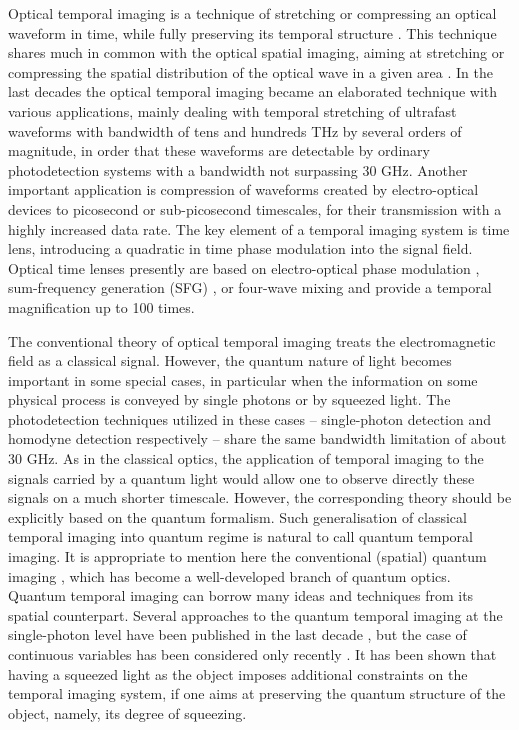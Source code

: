 \documentclass[10pt,twocolumn]{article}
\begin{document}
Optical temporal imaging is a technique of stretching or compressing an optical waveform in time, while fully preserving its temporal structure \cite{Copmany2011,Salem2013}. This technique shares much in common with the optical spatial imaging, aiming at stretching or compressing the spatial distribution of the optical wave in a given area \cite{Kolner1994}. In the last decades the optical temporal imaging became an elaborated technique with various applications, mainly dealing with temporal stretching of ultrafast waveforms with bandwidth of tens and hundreds THz by several orders of magnitude, in order that these waveforms are detectable by ordinary photodetection systems with a bandwidth not surpassing 30 GHz. Another important application is compression of waveforms created by electro-optical devices to picosecond or sub-picosecond timescales, for their transmission with a highly increased data rate. The key element of a temporal imaging system is time lens, introducing a quadratic in time phase modulation into the signal field. Optical time lenses presently are based on electro-optical phase modulation \cite{Giordmaine1968,Grischowsky1974,Kolner1988,Kolner1989,Karpinski2016}, sum-frequency generation (SFG) \cite{Agrawal1989,Bennett1994,Bennett1999,Bennett2000a,Bennett2000b,Bennett2001,Hernandez2013}, or four-wave mixing \cite{Foster2008,Foster2009,Okawachi2009,Kuzucu2009} and provide a temporal magnification up to 100 times.

The conventional theory of optical temporal imaging treats the electromagnetic field as a classical signal. However, the quantum nature of light becomes important in some special cases, in particular when the information on some physical process is conveyed by single photons or by squeezed light. The photodetection techniques utilized in these cases -- single-photon detection and homodyne detection respectively -- share the same bandwidth limitation of about 30 GHz. As in the classical optics, the application of temporal imaging to the signals carried by a quantum light would allow one to observe directly these signals on a much shorter timescale. However, the corresponding theory should be explicitly based on the quantum formalism. Such generalisation of classical temporal imaging into quantum regime is natural to call quantum temporal imaging. It is appropriate to mention here the conventional (spatial) quantum imaging \cite{Lugiato2002,QI-JMO2006,Shih2007,Kolobov2007}, which has become a well-developed branch of quantum optics. Quantum temporal imaging can borrow many ideas and techniques from its spatial counterpart. Several approaches to the quantum temporal imaging at the single-photon level have been published in the last decade \cite{Kielpinski2011,Lavoie2013,Zhu2013,Donohue2015}, but the case of continuous variables has been considered only recently \cite{Patera2015}. It has been shown that having a squeezed light as the object imposes additional constraints on the temporal imaging system, if one aims at preserving the quantum structure of the object, namely, its degree of squeezing.
\end{document}
